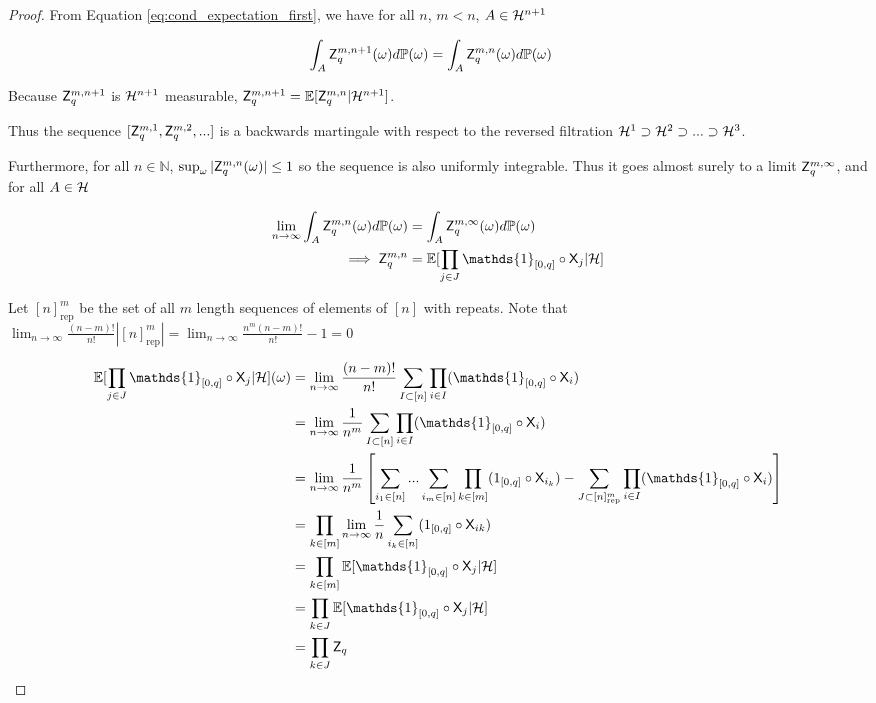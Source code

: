 \begin{proof}
From Equation \ref{eq:cond_expectation_first}, we have for all $n$, $m<n$, $A\in \mathcal{H}^{n+1}$

\begin{align}
    \int_{A} \mathsf{Z}_q^{m,n+1} (\omega) d\mathbb{P}(\omega) &= \int_{A} \mathsf{Z}_q^{m,n} (\omega) d\mathbb{P}(\omega)
\end{align}

Because $\mathsf{Z}_q^{m,n+1}$ is $\mathcal{H}^{n+1}$ measurable, $\mathsf{Z}_q^{m,n+1} = \mathbb{E}[\mathsf{Z}_q^{m,n}|\mathcal{H}^{n+1}]$.

Thus the sequence $[\mathsf{Z}^{m,1}_q,\mathsf{Z}^{m,2}_q,...]$ is a backwards martingale with respect to the reversed filtration $\mathcal{H}^1\supset\mathcal{H}^2\supset...\supset \mathcal{H}^3$.

Furthermore, for all $n\in \mathbb{N}$, $\sup_\omega|\mathsf{Z}^{m,n}_q(\omega)|\leq 1$ so the sequence is also uniformly integrable. Thus it goes almost surely to a limit $\mathsf{Z}^{m,\infty}_q$, and for all $A\in \mathcal{H}$

\begin{align}
    \lim_{n\to\infty} \int_A \RV{Z}^{m,n}_q(\omega) d\prob{P}(\omega) &= \int_A \RV{Z}^{m,\infty}_q(\omega) d\prob{P}(\omega)\\
    \implies \RV{Z}^{m,n}_q &= \mathbb{E}[\prod_{j\in J} \mathds{1}_{[0,q]}\circ \RV{X}_j|\sigalg{H}]
\end{align}

Let $[n]^m_\mathrm{rep}$ be the set of all $m$ length sequences of elements of $[n]$ with repeats. Note that $\lim_{n\to\infty}\frac{(n-m)!}{n!}|[n]^m_\mathrm{rep}| = \lim_{n\to\infty}\frac{n^m(n-m)!}{n!}-1 = 0$

\begin{align}
    \mathbb{E}[\prod_{j\in J} \mathds{1}_{[0,q]}\circ \RV{X}_j|\sigalg{H}](\omega) &= \lim_{n\to\infty}\frac{(n-m)!}{n!}\sum_{I\subset[n]}\prod_{i\in I} (\mathds{1}_{[0,q]}\circ \RV{X}_i)\\
                                                                      &= \lim_{n\to\infty}\frac{1}{n^m}\sum_{I\subset[n]}\prod_{i\in I}(\mathds{1}_{[0,q]}\circ \RV{X}_i)\\
                                                                      &= \lim_{n\to\infty}\frac{1}{n^m}\left[\sum_{i_1\in [n]}...\sum_{i_m\in [n]}\prod_{k\in [m]} (1_{[0,q]}\circ \RV{X}_{i_k})-\sum_{J\subset[n]^m_\mathrm{rep}}\prod_{i\in I} (\mathds{1}_{[0,q]}\circ \RV{X}_i)\right]\\ 
                                                                      &= \prod_{k\in [m]} \lim_{n\to\infty} \frac{1}{n}\sum_{i_k\in[n]}(1_{[0,q]}\circ\RV{X}_{ik})\\
                                                                      &= \prod_{k\in [m]} \mathbb{E}[\mathds{1}_{[0,q]}\circ \RV{X}_j|\sigalg{H}]\\
                                                                      &= \prod_{k\in J} \mathbb{E}[\mathds{1}_{[0,q]}\circ \RV{X}_j|\sigalg{H}]\\
                                                                      &= \prod_{k\in J} \RV{Z}_q\label{eq:h_measurable}
\end{align}


\end{proof}
